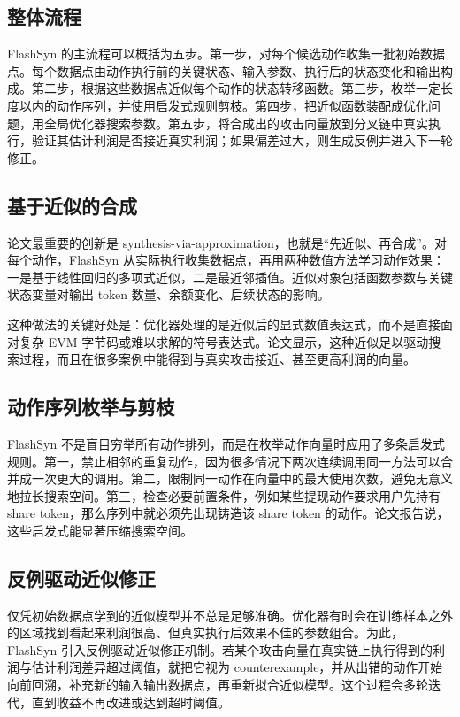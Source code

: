 \documentclass[UTF8,11pt]{ctexart}
\begin{document}
\subsection{整体流程}
FlashSyn 的主流程可以概括为五步。第一步，对每个候选动作收集一批初始数据点。每个数据点由动作执行前的关键状态、输入参数、执行后的状态变化和输出构成。第二步，根据这些数据点近似每个动作的状态转移函数。第三步，枚举一定长度以内的动作序列，并使用启发式规则剪枝。第四步，把近似函数装配成优化问题，用全局优化器搜索参数。第五步，将合成出的攻击向量放到分叉链中真实执行，验证其估计利润是否接近真实利润；如果偏差过大，则生成反例并进入下一轮修正。

\subsection{基于近似的合成}
论文最重要的创新是 synthesis-via-approximation，也就是“先近似、再合成”。对每个动作，FlashSyn 从实际执行收集数据点，再用两种数值方法学习动作效果：一是基于线性回归的多项式近似，二是最近邻插值。近似对象包括函数参数与关键状态变量对输出 token 数量、余额变化、后续状态的影响。

这种做法的关键好处是：优化器处理的是近似后的显式数值表达式，而不是直接面对复杂 EVM 字节码或难以求解的符号表达式。论文显示，这种近似足以驱动搜索过程，而且在很多案例中能得到与真实攻击接近、甚至更高利润的向量。

\subsection{动作序列枚举与剪枝}
FlashSyn 不是盲目穷举所有动作排列，而是在枚举动作向量时应用了多条启发式规则。第一，禁止相邻的重复动作，因为很多情况下两次连续调用同一方法可以合并成一次更大的调用。第二，限制同一动作在向量中的最大使用次数，避免无意义地拉长搜索空间。第三，检查必要前置条件，例如某些提现动作要求用户先持有 share token，那么序列中就必须先出现铸造该 share token 的动作。论文报告说，这些启发式能显著压缩搜索空间。

\subsection{反例驱动近似修正}
仅凭初始数据点学到的近似模型并不总是足够准确。优化器有时会在训练样本之外的区域找到看起来利润很高、但真实执行后效果不佳的参数组合。为此，FlashSyn 引入反例驱动近似修正机制。若某个攻击向量在真实链上执行得到的利润与估计利润差异超过阈值，就把它视为 counterexample，并从出错的动作开始向前回溯，补充新的输入输出数据点，再重新拟合近似模型。这个过程会多轮迭代，直到收益不再改进或达到超时阈值。
\end{document}

